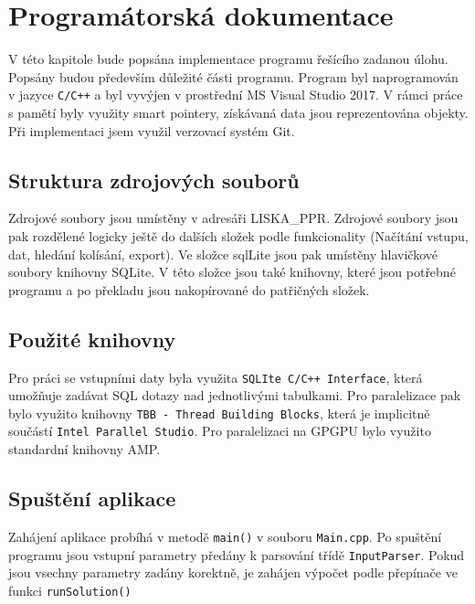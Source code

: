 \documentclass{article}
\begin{document}
	\section{Programátorská dokumentace}
	V této kapitole bude popsána implementace programu řešícího zadanou úlohu. Popsány budou především důležité části programu. 
	Program byl naprogramován v jazyce \texttt{C/C++} a byl vyvýjen v prostřední MS Visual Studio 2017. V rámci práce s pamětí byly využity smart pointery, získávaná data jsou reprezentována objekty. Při implementaci jsem využil verzovací systém Git.
	\subsection{Struktura zdrojových souborů}
	
	Zdrojové soubory jsou umístěny v adresáři LISKA\_PPR. Zdrojové soubory jsou pak rozdělené logicky ještě do dalších složek podle funkcionality (Načítání vstupu, dat, hledání kolísání, export). Ve složce sqlLite jsou pak umístěny hlavičkové soubory knihovny SQLite. V této složce jsou také knihovny, které jsou potřebné programu a po překladu jsou nakopírované do patřičných složek.
	
	\subsection{Použité knihovny}
	Pro práci se vstupními daty byla využita \texttt{SQLIte C/C++ Interface}, která umožňuje zadávat SQL dotazy nad jednotlivými tabulkami. Pro paralelizace pak bylo využito knihovny  \texttt{TBB - Thread Building Blocks}, která je implicitně součástí \texttt{Intel Parallel Studio}. Pro paralelizaci na GPGPU bylo využito standardní knihovny AMP.
	
	\subsection{Spuštění aplikace}
	
	Zahájení aplikace probíhá v metodě \texttt{main()} v souboru \texttt{Main.cpp}. Po spuštění programu jsou vstupní parametry předány k parsování třídě \texttt{InputParser}. Pokud jsou vsechny parametry zadány korektně, je zahájen výpočet podle přepínače ve funkci \texttt{runSolution()}
	
\end{document}
